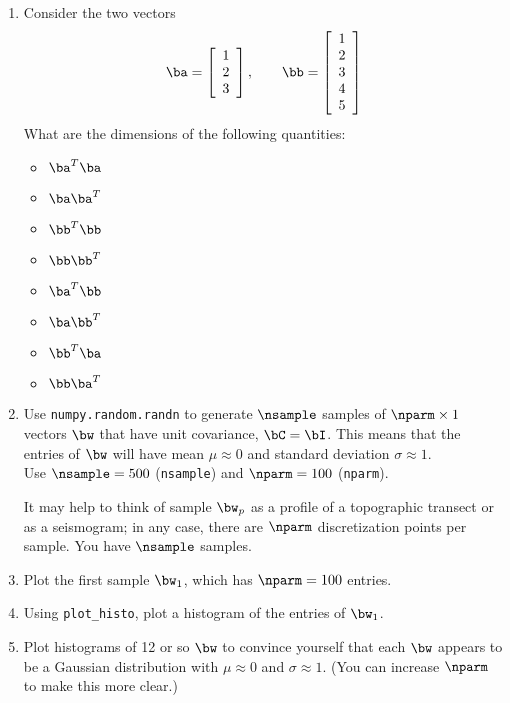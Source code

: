 \documentclass[11pt,titlepage,fleqn]{article}
\begin{document}
\begin{enumerate}
\item Consider the two vectors
%
\begin{equation*}
\ba =  \left[ \begin{array}{r} 1 \\ 2 \\ 3 \end{array} \right],
\quad\quad
\bb =  \left[ \begin{array}{r} 1 \\ 2 \\ 3 \\ 4 \\ 5 \end{array} \right]
\end{equation*}
%
What are the dimensions of the following quantities:
%
\begin{itemize}
\item $\ba^T \ba$
\item $\ba \ba^T$
\item $\bb^T \bb$
\item $\bb \bb^T$
\item $\ba^T \bb$
\item $\ba \bb^T$
\item $\bb^T \ba$
\item $\bb \ba^T$
\end{itemize}

\item Use \verb+numpy.random.randn+ to generate $\nsample$ samples of $\nparm \times 1$ vectors $\bw$ that have unit covariance, $\bC = \bI$.
This means that the entries of $\bw$ will have mean $\mu \approx 0$ and standard deviation $\sigma \approx 1$. \\
Use $\nsample = 500$ (\verb+nsample+) and $\nparm = 100$ (\verb+nparm+).

It may help to think of sample $\bw_p$ as a profile of a topographic transect or as a seismogram; in any case, there are $\nparm$ discretization points per sample. You have $\nsample$ samples.

\item Plot the first sample $\bw_1$, which has $\nparm = 100$ entries.

\item Using \verb+plot_histo+, plot a histogram of the entries of $\bw_1$.

\item Plot histograms of 12 or so $\bw$ to convince yourself that each $\bw$ appears to be a Gaussian distribution with $\mu \approx 0$ and $\sigma \approx 1$. (You can increase $\nparm$ to make this more clear.)


\end{enumerate}
\end{document}
